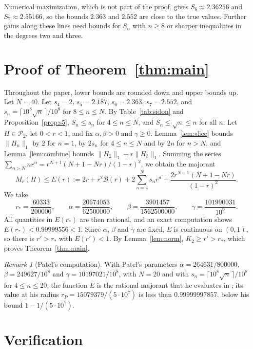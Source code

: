 \documentclass[11pt]{amsart}
\theoremstyle{remark}
\newtheorem{remark}[theorem]{Remark}
\numberwithin{equation}{section}
\newcommand{\Pclass}{\mathcal{P}_2}
\newcommand{\Bfun}{\mathcal{B}}
\newcommand{\rstar}{\frac{60333}{200000}}
\newcommand{\ParA}{\frac{20674053}{62500000}}
\newcommand{\ParB}{\frac{3901457}{1562500000}}
\newcommand{\ParG}{\frac{101990031}{10^9}}
\newcommand{\FiveOwn}{2.187}
\newcommand{\TailN}{40}
\newcommand{\Evalue}{0.99999556}
\newcommand{\SixOwn}{2.363}
\newcommand{\EvaluePatel}{0.99999997857}
\newcommand{\SevenOwn}{2.552}
\newcommand{\SevenNum}{2.55166}
\begin{document}
Numerical maximization, which is not part of the proof, gives $S_6\approx2.36256$ and $S_7\approx\SevenNum$, so the bounds $\SixOwn$ and $\SevenOwn$ are close to the true values. Further gains along these lines need bounds for $S_n$ with $n\ge8$ or sharper inequalities in the degrees two and three.

\section{Proof of Theorem~\ref{thm:main}}\label{sec:proof}

Throughout the paper, lower bounds are rounded down and upper bounds up. Let $N=\TailN$. Let $s_4=2$, $s_5=\FiveOwn$, $s_6=\SixOwn$, $s_7=\SevenOwn$, and $s_n=\lceil10^8\sqrt n\,\rceil/10^8$ for $8\le n\le N$. By Table~\ref{tab:sidon} and Proposition~\ref{prop:s5}, $S_n\le s_n$ for $4\le n\le N$, and $S_n\le\sqrt n\le n$ for all $n$. Let $H\in\Pclass$, let $0<r<1$, and fix $\alpha,\beta>0$ and $\gamma\ge0$. Lemma~\ref{lem:slice} bounds $\|H_n\|_1$ by $2$ for $n=1$, by $2s_n$ for $4\le n\le N$ and by $2n$ for $n>N$, and Lemma~\ref{lem:combine} bounds $\|H_2\|_1+r\|H_3\|_1$. Summing the series $\sum_{n>N}nr^n=r^{N+1}(N+1-Nr)/(1-r)^2$, we obtain the majorant
\[
M_r(H)\le E(r):=2r+r^2\Bfun(r)+2\sum_{n=4}^{N}s_nr^n+\frac{2r^{N+1}(N+1-Nr)}{(1-r)^2}.
\]
We take
\[
r_*=\rstar,\qquad\alpha=\ParA,\qquad\beta=\ParB,\qquad\gamma=\ParG.
\]
All quantities in $E(r_*)$ are then rational, and an exact computation shows $E(r_*)<\Evalue<1$. Since $\alpha$, $\beta$ and $\gamma$ are fixed, $E$ is continuous on $(0,1)$, so there is $r'>r_*$ with $E(r')<1$. By Lemma~\ref{lem:norm}, $K_2\ge r'>r_*$, which proves Theorem~\ref{thm:main}.

\begin{remark}[Patel's computation]\label{rem:patel}
With Patel's parameters $\alpha=264631/800000$, $\beta=249627/10^8$ and $\gamma=10197021/10^8$, with $N=20$ and with $s_n=\lceil10^8\sqrt n\,\rceil/10^8$ for $4\le n\le20$, the function $E$ is the rational majorant that he evaluates in \cite{PatMDB}; its value at his radius $r_P=15079379/(5\cdot10^7)$ is less than $\EvaluePatel$, below his bound $1-1/(5\cdot10^7)$.
\end{remark}

\section{Verification}\label{sec:verif}
\end{document}
